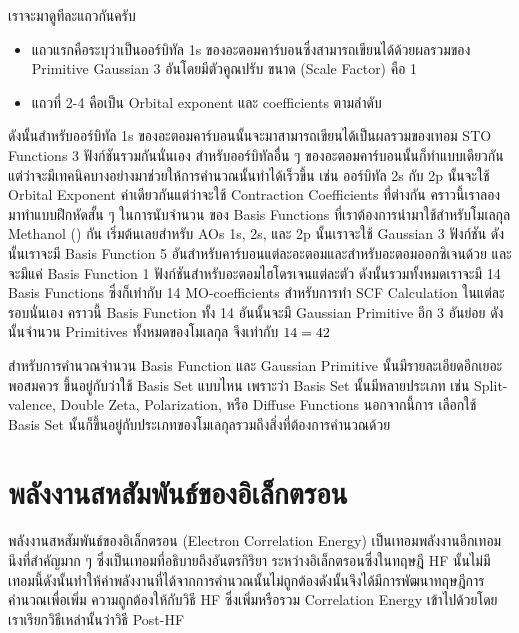 เราจะมาดูทีละแถวกันครับ

\begin{itemize}[topsep=0pt,noitemsep]
  \setlength\itemsep{1em}
  \item แถวแรกคือระบุว่าเป็นออร์บิทัล 1s ของอะตอมคาร์บอนซึ่งสามารถเขียนได้ด้วยผลรวมของ Primitive Gaussian 3 อันโดยมีตัวคูณปรับ%
        ขนาด (Scale Factor) คือ 1

  \item แถวที่ 2-4 คือเป็น Orbital exponent และ  coefficients ตามลำดับ
\end{itemize}

\noindent ดังนั้นสำหรับออร์บิทัล 1s ของอะตอมคาร์บอนนั้นจะมาสามารถเขียนได้เป็นผลรวมของเทอม STO Functions 3 ฟังก์ชันรวมกันนั่นเอง
สำหรับออร์บิทัลอื่น ๆ ของอะตอมคาร์บอนนั้นก็ทำแบบเดียวกันแต่ว่าจะมีเทคนิคบางอย่างมาช่วยให้การคำนวณนั้นทำได้เร็วขึ้น เช่น ออร์บิทัล 2s กับ 2p
นั้นจะใช้ Orbital Exponent ค่าเดียวกันแต่ว่าจะใช้ Contraction Coefficients ที่ต่างกัน คราวนี้เราลองมาทำแบบฝึกหัดสั้น ๆ ในการนับจำนวน%
ของ Basis Functions ที่เราต้องการนำมาใช้สำหรับโมเลกุล Methanol () กัน เริ่มต้นเลยสำหรับ AOs 1s, 2s, และ 2p นั้นเราจะใช้
Gaussian 3 ฟังก์ชัน ดังนั้นเราจะมี Basis Function 5 อันสำหรับคาร์บอนแต่ละอะตอมและสำหรับอะตอมออกซิเจนด้วย และจะมีแค่ Basis Function
1 ฟังก์ชันสำหรับอะตอมไฮโดรเจนแต่ละตัว ดังนั้นรวมทั้งหมดเราจะมี 14 Basis Functions ซึ่งก็เท่ากับ 14 MO-coefficients สำหรับการทำ SCF
Calculation ในแต่ละรอบนั่นเอง คราวนี้ Basis Function ทั้ง 14 อันนั้นจะมี Gaussian Primitive อีก 3 อันย่อย ดังนั้นจำนวน Primitives
ทั้งหมดของโมเลกุล  จึงเท่ากับ $14 \time 3 = 42$

สำหรับการคำนวณจำนวน Basis Function และ Gaussian Primitive นั้นมีรายละเอียดอีกเยอะพอสมควร ขึ้นอยู่กับว่าใช้ Basis Set แบบไหน
เพราะว่า Basis Set นั้นมีหลายประเภท เช่น Split-valence, Double Zeta, Polarization, หรือ Diffuse Functions นอกจากนี้การ%
เลือกใช้ Basis Set นั้นก็ขึ้นอยู่กับประเภทของโมเลกุลรวมถึงสิ่งที่ต้องการคำนวณด้วย

\section{พลังงานสหสัมพันธ์ของอิเล็กตรอน}

พลังงานสหสัมพันธ์ของอิเล็กตรอน (Electron Correlation Energy) เป็นเทอมพลังงานอีกเทอมนึงที่สำคัญมาก ๆ ซึ่งเป็นเทอมที่อธิบายถึงอันตรกิริยา%
ระหว่างอิเล็กตรอนซึ่งในทฤษฎี HF นั้นไม่มีเทอมนี้ดังนั้นทำให้ค่าพลังงานที่ได้จากการคำนวณนั้นไม่ถูกต้องดังนั้นจึงได้มีการพัฒนาทฤษฎีการคำนวณเพื่อเพิ่ม%
ความถูกต้องให้กับวิธี HF ซึ่งเพิ่มหรือรวม Correlation Energy เข้าไปด้วยโดยเราเรียกวิธีเหล่านั้นว่าวิธี Post-HF

